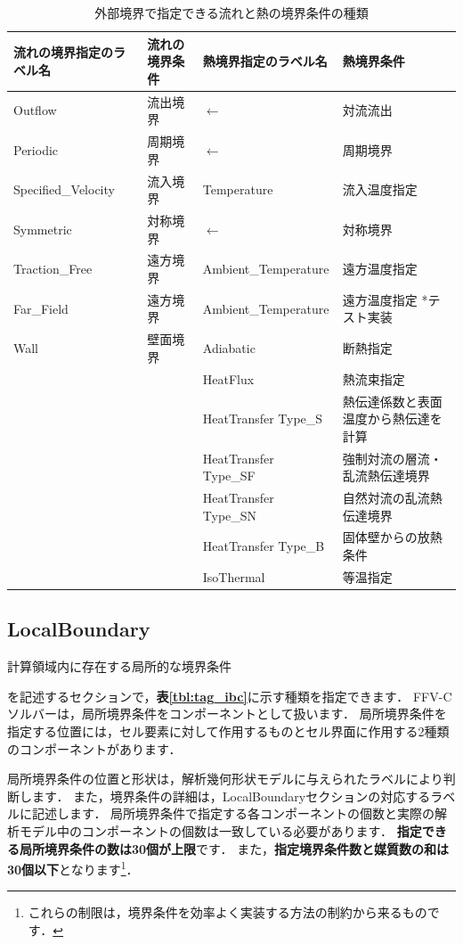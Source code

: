 \begin{table}[htdp]
\caption{外部境界で指定できる流れと熱の境界条件の種類}
\begin{center}
\small
\begin{tabular}{ll|ll} \toprule
流れの境界指定のラベル名 &  流れの境界条件 & 熱境界指定のラベル名 & 熱境界条件\\ \midrule
Outflow & 流出境界 & $\leftarrow$ & 対流流出\\
Periodic & 周期境界 & $\leftarrow$ & 周期境界\\
Specified\_Velocity & 流入境界 & Temperature & 流入温度指定\\
Symmetric & 対称境界 & $\leftarrow$ & 対称境界\\
Traction\_Free & 遠方境界 & Ambient\_Temperature & 遠方温度指定\\
Far\_Field & 遠方境界 & Ambient\_Temperature & 遠方温度指定 *テスト実装\\ \hline
Wall & 壁面境界 & Adiabatic & 断熱指定\\
& & HeatFlux & 熱流束指定\\ 
& & HeatTransfer Type\_S & 熱伝達係数と表面温度から熱伝達を計算\\
& & HeatTransfer Type\_SF & 強制対流の層流・乱流熱伝達境界\\
& & HeatTransfer Type\_SN & 自然対流の乱流熱伝達境界\\
& & HeatTransfer Type\_B & 固体壁からの放熱条件\\
& & IsoThermal & 等温指定\\
\bottomrule
\end{tabular}
\end{center}
\label{tbl:outer BC physical}
\end{table}


%
\pagebreak
\subsection{LocalBoundary}

\hypertarget{tgt:localboundary}{計算領域内に存在する局所的な境界条件}を記述するセクションで，\textbf{表\ref{tbl:tag_ibc}}に示す種類を指定できます．
FFV-Cソルバーは，局所境界条件をコンポーネントとして扱います．
局所境界条件を指定する位置には，セル要素に対して作用するものとセル界面に作用する2種類のコンポーネントがあります．

局所境界条件の位置と形状は，解析幾何形状モデルに与えられたラベルにより判断します．
また，境界条件の詳細は，LocalBoundaryセクションの対応するラベルに記述します．
局所境界条件で指定する各コンポーネントの個数と実際の解析モデル中のコンポーネントの個数は一致している必要があります．
\textbf{指定できる局所境界条件の数は30個が上限}です．
また，\textbf{指定境界条件数と媒質数の和は30個以下}となります\footnote{これらの制限は，境界条件を効率よく実装する方法の制約から来るものです．}．

